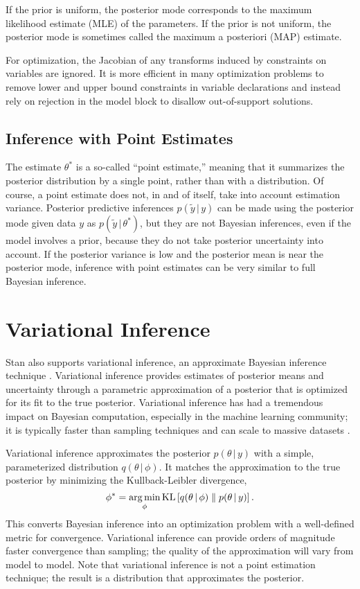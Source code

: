 If the prior is uniform, the posterior mode corresponds to the maximum
likelihood estimate (MLE) of the parameters.  If the prior is not
uniform, the posterior mode is sometimes called the maximum a
posteriori (MAP) estimate. 

For optimization, the Jacobian of any transforms induced by
constraints on variables are ignored.  It is more efficient in many
optimization problems to remove lower and upper bound constraints in
variable declarations and instead rely on rejection in the model
block to disallow out-of-support solutions.


\subsection{Inference with Point Estimates}

The estimate $\theta^{*}$ is a so-called ``point estimate,'' meaning
that it summarizes the posterior distribution by a single point,
rather than with a distribution.  Of course, a point estimate does
not, in and of itself, take into account estimation variance.
Posterior predictive inferences $p(\tilde{y} \, | \, y)$ can be made using
the posterior mode given data $y$ as $p(\tilde{y} \, | \, \theta^*)$, but they
are not Bayesian inferences, even if the model involves a prior,
because they do not take posterior uncertainty into account.  If the
posterior variance is low and the posterior mean is near the posterior
mode, inference with point estimates can be very similar to full
Bayesian inference.


\section{Variational Inference}

Stan also supports variational inference, an approximate Bayesian
inference technique
\citep{Jordan:1999,Wainwright-Jordan:2008}. Variational inference
provides estimates of posterior means and uncertainty through a
parametric approximation of a posterior that is optimized for its fit
to the true posterior. Variational inference has had a tremendous
impact on Bayesian computation, especially in the machine learning
community; it is typically faster than sampling techniques and can
scale to massive datasets \citep{Hoffman:2013}.

Variational inference approximates the posterior
$p(\theta \, | \, y)$ with a simple, parameterized distribution
$q(\theta \, | \, \phi)$. It matches the approximation to the
true posterior by minimizing the Kullback-Leibler divergence,
%
\[
  \phi^* = \argmin_\phi
  \KL{ q(\theta \, | \, \phi) }{ p(\theta \, | \, y) }.
\]
%
This converts Bayesian inference into an optimization problem with a
well-defined metric for convergence. Variational inference can provide orders of
magnitude faster convergence than sampling; the quality of the approximation
will vary from model to model. Note that variational inference is not a point
estimation technique; the result is a distribution that approximates the
posterior.

